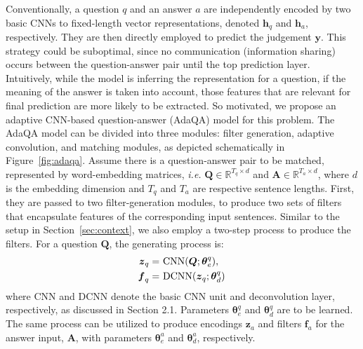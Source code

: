 \documentclass[11pt,a4paper]{article}
\begin{document}
Conventionally, a question $q$ and an answer $a$ are independently encoded by two basic CNNs to fixed-length vector representations, denoted $\boldsymbol{h}_q$ and $\boldsymbol{h}_a$, respectively. They are then directly employed to predict the judgement $\boldsymbol{y}$. This strategy could be suboptimal, since no communication (information sharing) occurs between the question-answer pair until the top prediction layer. Intuitively, while the model is inferring the representation for a question, if the meaning of the answer is taken into account, those features that are relevant for final prediction are more likely to be extracted. So motivated, we propose an adaptive CNN-based question-answer (AdaQA) model for this problem. 
The AdaQA model can be divided into three modules: filter generation, adaptive convolution, and matching modules, as depicted schematically in Figure~\ref{fig:adaqa}. Assume there is a question-answer pair to be matched, represented by word-embedding matrices, \emph{i.e.} $\boldsymbol{Q} \in \mathbb{R}^{T_q \times d}$ and $\boldsymbol{A} \in \mathbb{R}^{T_a \times d}$, where $d$ is the embedding dimension and $T_q$ and $T_a$ are respective sentence lengths. First, they are passed to two filter-generation modules, to produce two sets of filters that encapsulate features of the corresponding input sentences. Similar to the setup in Section~\ref{sec:context}, we also employ a two-step process to produce the filters. For a question $\boldsymbol{Q}$, the generating process is:
\begin{align}
\vspace{-8mm}
\boldsymbol{z}_q = & \ \textbf{\normalfont{CNN}}(\boldsymbol{Q}; \boldsymbol{\theta}_{e}^q) \label{eq:filter_cnn}, \\
\boldsymbol{f}_q = & \ \textbf{\normalfont{DCNN}}(\boldsymbol{z}_q; \boldsymbol{\theta}_{d}^q) \, \label{eq:filter_dcnn}
\vspace{-8mm}
\end{align}
where CNN and DCNN denote the basic CNN unit and deconvolution layer, respectively, as discussed in Section 2.1. Parameters $\boldsymbol{\theta}_{e}^q$ and $\boldsymbol{\theta}_{d}^q$ are to be learned. The same process can be utilized to produce encodings $\boldsymbol{z}_a$ and filters $\boldsymbol{f}_a$ for the answer input, $\boldsymbol{A}$, with parameters $\boldsymbol{\theta}_{e}^a$ and $\boldsymbol{\theta}_{d}^a$, respectively. 
\end{document}
